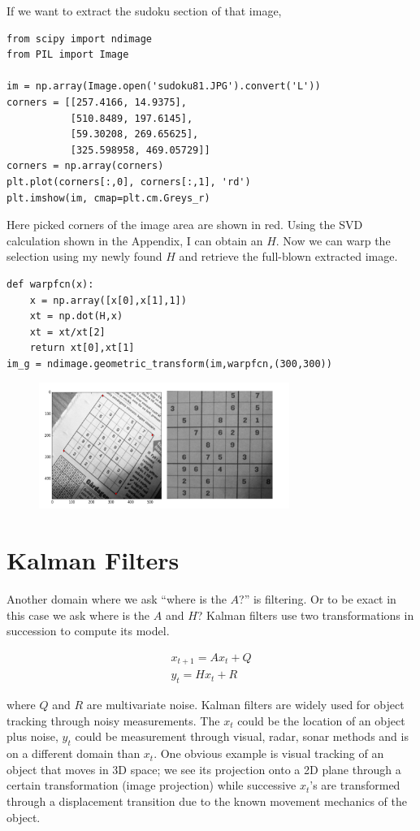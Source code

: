 \documentclass{article}
\begin{document}
If we want to extract the sudoku section of that image,

\begin{verbatim}
from scipy import ndimage
from PIL import Image

im = np.array(Image.open('sudoku81.JPG').convert('L'))
corners = [[257.4166, 14.9375], 
           [510.8489, 197.6145], 
           [59.30208, 269.65625], 
           [325.598958, 469.05729]]
corners = np.array(corners)
plt.plot(corners[:,0], corners[:,1], 'rd')
plt.imshow(im, cmap=plt.cm.Greys_r)
\end{verbatim}

Here picked corners of the image area are shown in red. Using the SVD
calculation shown in the Appendix, I can obtain an $H$. Now we can warp the
selection using my newly found $H$ and retrieve the full-blown extracted image.

\begin{verbatim}
def warpfcn(x):
    x = np.array([x[0],x[1],1])
    xt = np.dot(H,x)
    xt = xt/xt[2]
    return xt[0],xt[1]
im_g = ndimage.geometric_transform(im,warpfcn,(300,300))
\end{verbatim}

\begin{figure}[h]
  \centering
  \includegraphics[width=22em]{out2.png}
\end{figure}

\section{Kalman Filters}

Another domain where we ask ``where is the $A$?'' is filtering. Or to be exact
in this case we ask where is the $A$ and $H$? Kalman filters use two
transformations in succession to compute its model.

\begin{eqnarray*}
x_{t+1} = A x_t + Q\\
y_t = Hx_t + R
\end{eqnarray*}

where $Q$ and $R$ are multivariate noise. Kalman filters are widely used for
object tracking through noisy measurements. The $x_t$ could be the location of
an object plus noise, $y_t$ could be measurement through visual, radar, sonar
methods and is on a different domain than $x_t$. One obvious example is visual
tracking of an object that moves in 3D space; we see its projection onto a 2D
plane through a certain transformation (image projection) while successive
$x_t$'s are transformed through a displacement transition due to the known
movement mechanics of the object.
\end{document}
